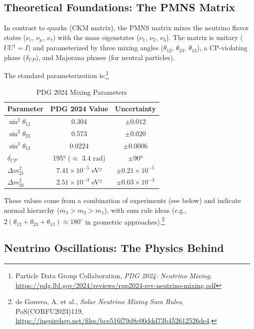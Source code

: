 	\subsection{Theoretical Foundations: The PMNS Matrix}
	
	In contrast to quarks (CKM matrix), the PMNS matrix mixes the neutrino flavor states ($\nu_e$, $\nu_\mu$, $\nu_\tau$) with the mass eigenstates ($\nu_1$, $\nu_2$, $\nu_3$). The matrix is unitary ($U U^\dagger = I$) and parameterized by three mixing angles ($\theta_{12}$, $\theta_{23}$, $\theta_{13}$), a CP-violating phase ($\delta_{CP}$), and Majorana phases (for neutral particles).
	
	The standard parameterization is:\footnote{Particle Data Group Collaboration, \emph{PDG 2024: Neutrino Mixing}, \url{https://pdg.lbl.gov/2024/reviews/rpp2024-rev-neutrino-mixing.pdf}}
	
	\begin{table}[h]
		\centering
		\begin{tabular}{lcc}
			\toprule
			\textbf{Parameter} & \textbf{PDG 2024 Value} & \textbf{Uncertainty} \\
			\midrule
			$\sin^2 \theta_{12}$ & 0.304 & $\pm 0.012$ \\
			$\sin^2 \theta_{23}$ & 0.573 & $\pm 0.020$ \\
			$\sin^2 \theta_{13}$ & 0.0224 & $\pm 0.0006$ \\
			$\delta_{CP}$ & 195° ($\approx$ 3.4 rad) & $\pm$90° \\
			$\Delta m^2_{21}$ & $7.41 \times 10^{-5}$ eV² & $\pm 0.21 \times 10^{-5}$ \\
			$\Delta m^2_{32}$ & $2.51 \times 10^{-3}$ eV² & $\pm 0.03 \times 10^{-3}$ \\
			\bottomrule
		\end{tabular}
		\caption{PDG 2024 Mixing Parameters}
		\label{tab:pdgparams}
	\end{table}
	
	These values come from a combination of experiments (see below) and indicate normal hierarchy ($m_3 > m_2 > m_1$), with sum rule ideas (e.g., $2(\theta_{12} + \theta_{23} + \theta_{13}) \approx 180^\circ$ in geometric approaches).\footnote{de Gouvea, A. et al., \emph{Solar Neutrino Mixing Sum Rules}, PoS(CORFU2023)119, \url{https://inspirehep.net/files/bce516f79d8c00ddd73b452612526de4}.}
	
	\subsection{Neutrino Oscillations: The Physics Behind}
	
